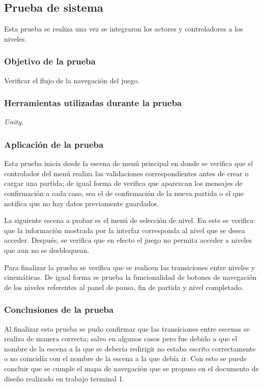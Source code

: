 \subsection{Prueba de sistema}
Esta prueba se realiza una vez se integraron los actores y controladores a los 
niveles.
\subsubsection{Objetivo de la prueba}
Verificar el flujo de la navegación del juego. 
\subsubsection{Herramientas utilizadas durante la prueba}
\textit{Unity.}
\subsubsection{Aplicación de la prueba}
Esta prueba inicia desde la escena de menú principal en donde se verifica que 
el controlador del menú realiza las validaciones correspondientes antes de 
crear o cargar una partida; de igual forma de verifica que aparezcan los 
mensajes de confirmación a cada caso, sea el de confirmación de la nueva partida 
o el que notifica que no hay datos previamente guardados.
\\
\par
La siguiente escena a probar es el menú de selección de nivel. En este se verifica 
que la información mostrada por la interfaz corresponda al nivel que se desea 
acceder. Después, se verifica que en efecto el juego no permita acceder a niveles 
que aun no se desbloquean.
\\
\par
Para finalizar la prueba se verifica que se realicen las transiciones entre 
niveles y cinemáticas. De igual forma se prueba la funcionalidad de botones de 
navegación de los niveles referentes al panel de pausa, fin de partida y nivel 
completado.
\subsubsection{Conclusiones de la prueba}
Al finalizar esta prueba se pudo confirmar que las transiciones entre escenas se 
realiza de manera correcta; salvo en algunos casos pero fue debido a que el nombre 
de la escena a la que se debería redirigir no estaba escrito correctamente o no 
coincidía con el nombre de la escena a la que debía ir. Con esto se puede concluir 
que se cumple el mapa de navegación que se propuso en el documento de diseño 
realizado en trabajo terminal 1.